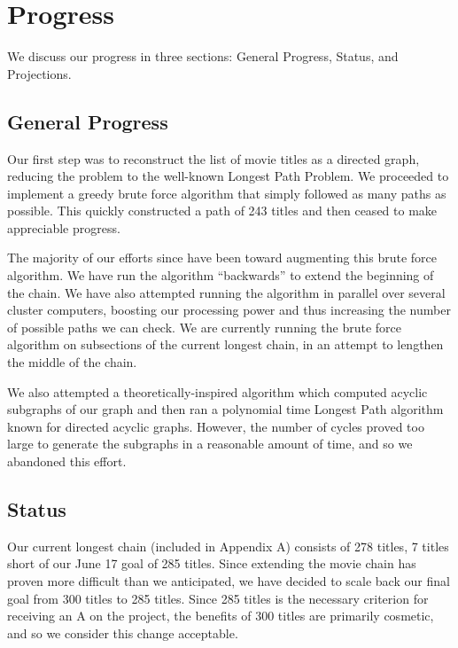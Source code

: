 \documentclass[11pt,english]{article}
\begin{document}
\vspace{-0.2cm}
\section{Progress}
We discuss our progress in three sections: General Progress, Status, and
Projections.

\vspace{-0.2cm}
\subsection{General Progress}
Our first step was to reconstruct the list of movie titles as a directed graph,
reducing the problem to the well-known Longest Path Problem.
We proceeded to implement a greedy brute force algorithm that simply followed
as many paths as possible. This quickly constructed a path of 243 titles and
then ceased to make appreciable progress.

The majority of our efforts since have been toward augmenting this brute force
algorithm. We have run the algorithm ``backwards'' to extend the beginning of
the chain. We have also attempted running the algorithm in parallel over
several cluster computers, boosting our processing power and thus increasing
the number of possible paths we can check. We are currently running the brute
force algorithm on subsections of the current longest chain, in an attempt to
lengthen the middle of the chain.

We also attempted a theoretically-inspired algorithm which computed acyclic
subgraphs of our graph and then ran a polynomial time Longest Path algorithm
known for directed acyclic graphs. However, the number of cycles proved too
large to generate the subgraphs in a reasonable amount of time, and so we
abandoned this effort.

\vspace{-0.2cm}
\subsection{Status}
Our current longest chain (included in Appendix A) consists of 278 titles,
7 titles short of our June 17 goal of 285 titles. Since extending the movie chain has
proven more difficult than we anticipated, we have decided to scale back our
final goal from 300 titles to 285 titles. Since 285 titles is the necessary
criterion for receiving an A on the project, the benefits of 300 titles are
primarily cosmetic, and so we consider this change acceptable.
\end{document}
